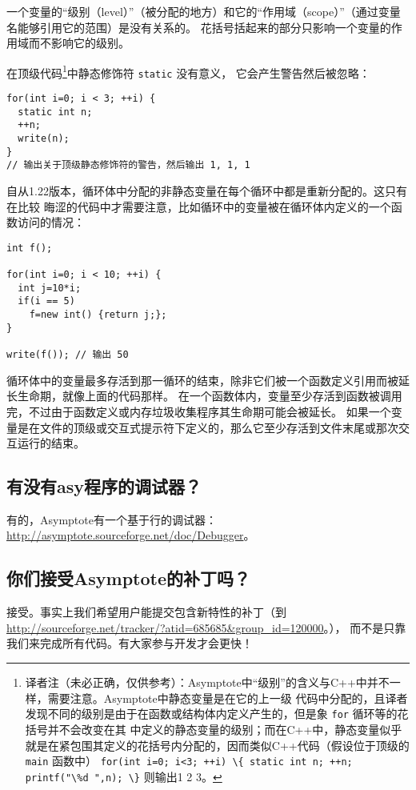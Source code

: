 一个变量的“级别（level）”（被分配的地方）和它的“作用域（scope）”（通过变量名能够引用它的范围）是没有关系的。
花括号括起来的部分只影响一个变量的作用域而不影响它的级别。

在顶级代码\footnote{译者注（未必正确，仅供参考）：Asymptote中“级别”的含义与C++中并不一样，需要注意。Asymptote中静态变量是在它的上一级
代码中分配的，且译者发现不同的级别是由于在函数或结构体内定义产生的，但是象 \verb|for| 循环等的花括号并不会改变在其
中定义的静态变量的级别；而在C++中，静态变量似乎就是在紧包围其定义的花括号内分配的，因而类似C++代码（假设位于顶级的 \verb|main| 函数中）
\verb|for(int i=0; i<3; ++i) \{ static int n; ++n; printf("\%d ",n); \}| 则输出1 2 3。}中静态修饰符 \verb|static| 没有意义，
它会产生警告然后被忽略：
\begin{lstlisting}
for(int i=0; i < 3; ++i) { 
  static int n;
  ++n;
  write(n);
}
// 输出关于顶级静态修饰符的警告，然后输出 1, 1, 1
\end{lstlisting}

自从1.22版本，循环体中分配的非静态变量在每个循环中都是重新分配的。这只有在比较
晦涩的代码中才需要注意，比如循环中的变量被在循环体内定义的一个函数访问的情况：

\begin{lstlisting}
int f();
 
for(int i=0; i < 10; ++i) { 
  int j=10*i;
  if(i == 5)
    f=new int() {return j;};
} 
 
write(f()); // 输出 50
\end{lstlisting}

循环体中的变量最多存活到那一循环的结束，除非它们被一个函数定义引用而被延长生命期，就像上面的代码那样。
在一个函数体内，变量至少存活到函数被调用完，不过由于函数定义或内存垃圾收集程序其生命期可能会被延长。
如果一个变量是在文件的顶级或交互式提示符下定义的，那么它至少存活到文件末尾或那次交互运行的结束。


\subsection{\label{Q7.8}有没有asy程序的调试器？}
有的，Asymptote有一个基于行的调试器： \url{http://asymptote.sourceforge.net/doc/Debugger}。

\subsection{\label{Q7.9}你们接受Asymptote的补丁吗？}

接受。事实上我们希望用户能提交包含新特性的补丁（到 \url{http://sourceforge.net/tracker/?atid=685685&group_id=120000}。），
而不是只靠我们来完成所有代码。有大家参与开发才会更快！

